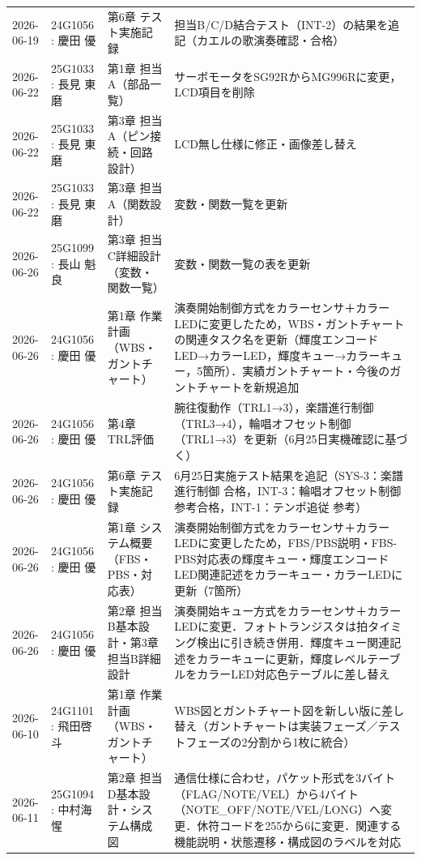 \begin{longtable}{p{2.2cm}p{3.5cm}p{4cm}p{5.5cm}}
2026-06-19 & 24G1056 : 慶田 優 & 第6章 テスト実施記録 & 担当B/C/D結合テスト（INT-2）の結果を追記（カエルの歌演奏確認・合格） \\
2026-06-22 & 25G1033 : 長見 東磨 & 第1章 担当A（部品一覧） & サーボモータをSG92RからMG996Rに変更，LCD項目を削除 \\
2026-06-22 & 25G1033 : 長見 東磨 & 第3章 担当A（ピン接続・回路設計） & LCD無し仕様に修正・画像差し替え \\
2026-06-22 & 25G1033 : 長見 東磨 & 第3章 担当A（関数設計） & 変数・関数一覧を更新 \\
2026-06-26 & 25G1099 : 長山 魁良 & 第3章 担当C詳細設計（変数・関数一覧） &変数・関数一覧の表を更新 \\

2026-06-26 & 24G1056 : 慶田 優 & 第1章 作業計画（WBS・ガントチャート） & 演奏開始制御方式をカラーセンサ＋カラーLEDに変更したため，WBS・ガントチャートの関連タスク名を更新（輝度エンコードLED→カラーLED，輝度キュー→カラーキュー，5箇所）．実績ガントチャート・今後のガントチャートを新規追加 \\
2026-06-26 & 24G1056 : 慶田 優 & 第4章 TRL評価 & 腕往復動作（TRL1→3），楽譜進行制御（TRL3→4），輪唱オフセット制御（TRL1→3）を更新（6月25日実機確認に基づく） \\
2026-06-26 & 24G1056 : 慶田 優 & 第6章 テスト実施記録 & 6月25日実施テスト結果を追記（SYS-3：楽譜進行制御 合格，INT-3：輪唱オフセット制御 参考合格，INT-1：テンポ追従 参考） \\
2026-06-26 & 24G1056 : 慶田 優 & 第1章 システム概要（FBS・PBS・対応表） & 演奏開始制御方式をカラーセンサ＋カラーLEDに変更したため，FBS/PBS説明・FBS-PBS対応表の輝度キュー・輝度エンコードLED関連記述をカラーキュー・カラーLEDに更新（7箇所） \\
2026-06-26 & 24G1056 : 慶田 優 & 第2章 担当B基本設計・第3章 担当B詳細設計 & 演奏開始キュー方式をカラーセンサ＋カラーLEDに変更．フォトトランジスタは拍タイミング検出に引き続き併用．輝度キュー関連記述をカラーキューに更新，輝度レベルテーブルをカラーLED対応色テーブルに差し替え \\
2026-06-10 & 24G1101 : 飛田啓斗 & 第1章 作業計画（WBS・ガントチャート） & WBS図とガントチャート図を新しい版に差し替え（ガントチャートは実装フェーズ／テストフェーズの2分割から1枚に統合） \\
2026-06-11 & 25G1094 : 中村海惺 & 第2章 担当D基本設計・システム構成図 & 通信仕様に合わせ，パケット形式を3バイト（FLAG/NOTE/VEL）から4バイト（NOTE\_OFF/NOTE/VEL/LONG）へ変更．休符コードを255から6に変更．関連する機能説明・状態遷移・構成図のラベルを対応 \\

\end{longtable}
